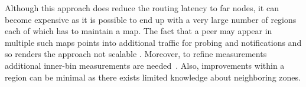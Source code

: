 Although this approach does reduce the routing latency to far nodes, it
can become expensive as it is 
possible to end up with a very large number of regions
each of which has to maintain a map. 
The fact that a peer may appear in multiple
such maps points into additional traffic for probing and notifications
and so renders the approach not scalable \cite{RGJZ2004}. 
Moreover, to refine measurements
additional inner-bin measurements are needed~\cite{WZS2004}.
Also, improvements within a region can be minimal as there exists
limited knowledge about neighboring zones.
%
%
%
%
%
